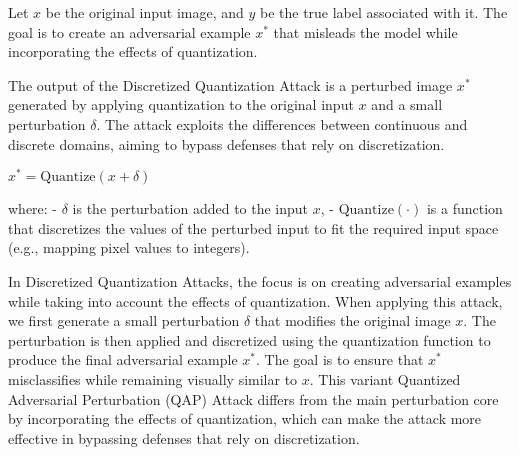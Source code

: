 Let $x$ be the original input image, and $y$ be the true label associated with it. The goal is to create an adversarial example $x^*$ that misleads the model while incorporating the effects of quantization.

The output of the Discretized Quantization Attack is a perturbed image $x^*$ generated by applying quantization to the original input $x$ and a small perturbation $\delta$. The attack exploits the differences between continuous and discrete domains, aiming to bypass defenses that rely on discretization.

$x^* = \text{Quantize}(x + \delta)$

where:
- $\delta$ is the perturbation added to the input $x$,
- $\text{Quantize}(\cdot)$ is a function that discretizes the values of the perturbed input to fit the required input space (e.g., mapping pixel values to integers).

In Discretized Quantization Attacks, the focus is on creating adversarial examples while taking into account the effects of quantization. When applying this attack, we first generate a small perturbation $\delta$ that modifies the original image $x$. The perturbation is then applied and discretized using the quantization function to produce the final adversarial example $x^*$. The goal is to ensure that $x^*$ misclassifies while remaining visually similar to $x$. This variant Quantized Adversarial Perturbation (QAP) Attack differs from the main perturbation core by incorporating the effects of quantization, which can make the attack more effective in bypassing defenses that rely on discretization.
